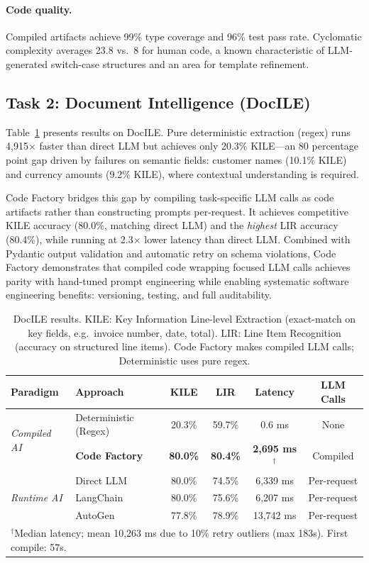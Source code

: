 \documentclass[11pt]{article}
\begin{document}
\paragraph{Code quality.} Compiled artifacts achieve 99\% type coverage and 96\% test pass rate. Cyclomatic complexity averages 23.8 vs.\ 8 for human code, a known characteristic of LLM-generated switch-case structures \citep{gitclear2025} and an area for template refinement.

\subsection{Task 2: Document Intelligence (DocILE)}

Table~\ref{tab:docile-main} presents results on DocILE. Pure deterministic extraction (regex) runs 4,915$\times$ faster than direct LLM but achieves only 20.3\% KILE---an 80 percentage point gap driven by failures on semantic fields: customer names (10.1\% KILE) and currency amounts (9.2\% KILE), where contextual understanding is required.

Code Factory bridges this gap by compiling task-specific LLM calls as code artifacts rather than constructing prompts per-request. It achieves competitive KILE accuracy (80.0\%, matching direct LLM) and the \emph{highest} LIR accuracy (80.4\%), while running at 2.3$\times$ lower latency than direct LLM. Combined with Pydantic output validation and automatic retry on schema violations, Code Factory demonstrates that compiled code wrapping focused LLM calls achieves parity with hand-tuned prompt engineering while enabling systematic software engineering benefits: versioning, testing, and full auditability.

\begin{table}[ht]
\centering
\caption{DocILE results. KILE: Key Information Line-level Extraction (exact-match on key fields, e.g.\ invoice number, date, total). LIR: Line Item Recognition (accuracy on structured line items). Code Factory makes compiled LLM calls; Deterministic uses pure regex.}
\label{tab:docile-main}
\begin{tabular}{llcccc}
\toprule
\textbf{Paradigm} & \textbf{Approach} & \textbf{KILE} & \textbf{LIR} & \textbf{Latency} & \textbf{LLM Calls} \\
\midrule
\multirow{2}{*}{\textit{Compiled AI}}
  & Deterministic (Regex) & 20.3\% & 59.7\% & 0.6 ms & None \\
  & \textbf{Code Factory} & \textbf{80.0\%} & \textbf{80.4\%} & \textbf{2,695 ms}$^\dagger$ & Compiled \\
\midrule
\multirow{3}{*}{\textit{Runtime AI}}
  & Direct LLM & 80.0\% & 74.5\% & 6,339 ms & Per-request \\
  & LangChain  & 80.0\% & 75.6\% & 6,207 ms & Per-request \\
  & AutoGen    & 77.8\% & 78.9\% & 13,742 ms & Per-request \\
\bottomrule
\multicolumn{6}{l}{\footnotesize $^\dagger$Median latency; mean 10,263 ms due to 10\% retry outliers (max 183s). First compile: 57s.} \\
\end{tabular}
\end{table}
\end{document}
